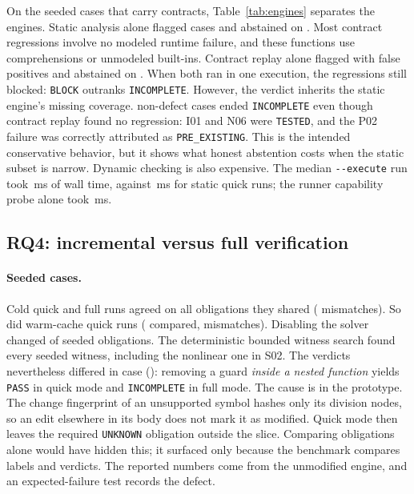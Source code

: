 \documentclass[10pt,twocolumn]{article}
\newcommand{\opt}[1]{\texttt{-{}-#1}}
\newcommand{\res}[1]{\texttt{\small #1}}
\begin{document}
On the \SeedContractCases{} seeded cases that carry contracts, Table~\ref{tab:engines} separates the engines. Static
analysis alone flagged \EngStaticTP{} cases and abstained on \EngStaticAbst{}. Most contract regressions involve no
modeled runtime failure, and these functions use comprehensions or unmodeled built-ins. Contract replay alone flagged
\EngDynamicTP{} with \EngDynamicFP{} false positives and abstained on \EngDynamicAbst{}. When both ran in one execution,
the regressions still blocked: \res{BLOCK} outranks \res{INCOMPLETE}. However, the verdict inherits the static engine's
missing coverage. \EngCombinedAbst{} non-defect cases ended \res{INCOMPLETE} even though contract replay found no
regression: I01 and N06 were \res{TESTED}, and the P02 failure was correctly attributed as \res{PRE\_EXISTING}. This is the intended conservative behavior, but it shows what honest abstention costs when the static
subset is narrow. Dynamic checking is also expensive. The median \opt{execute} run took \SeedExecWallMedian\,ms of wall
time, against \SeedQuickWallMedian\,ms for static quick runs; the runner capability probe alone took
\SeedRunnerProbeMedianMs\,ms.



\subsection{RQ4: incremental versus full verification}
\label{sec:rq4}

\paragraph{Seeded cases.}
Cold quick and full runs agreed on all \SeedIncCompared{} obligations they shared (\SeedIncMismatch{} mismatches). So
did warm-cache quick runs (\SeedWarmCompared{} compared, \SeedWarmMismatch{} mismatches). Disabling the solver changed
\SeedSolverChanged{} of \SeedSolverCompared{} seeded obligations. The deterministic bounded witness search found every
seeded witness, including the nonlinear one in S02. The verdicts nevertheless differed in \SeedIncVerdictMismatchN{} case
(\SeedIncVerdictMismatch): removing a guard \emph{inside a nested function} yields \res{PASS} in quick mode and
\res{INCOMPLETE} in full mode. The cause is in the prototype. The change fingerprint of an unsupported symbol hashes
only its division nodes, so an edit elsewhere in its body does not mark it as modified. Quick mode then leaves the
required \res{UNKNOWN} obligation outside the slice. Comparing obligations alone would have hidden this; it surfaced
only because the benchmark compares labels and verdicts. The reported numbers come from the unmodified engine, and an
expected-failure test records the defect.
\end{document}
